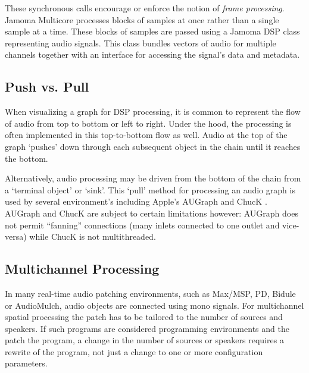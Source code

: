 \documentclass[twoside,a4paper]{article}
\begin{document}

These synchronous calls encourage or enforce the notion of \emph{frame processing}.  
Jamoma Multicore processes blocks of samples at once rather than a single sample at a time.  
These blocks of samples are passed using a Jamoma DSP class representing audio signals.  This class bundles vectors of audio for multiple channels together with an interface for accessing the signal's data and metadata.




\subsection{Push vs. Pull} \label{sec:pull} %

When visualizing a graph for DSP processing, it is common to represent the flow of audio from top to bottom or left to right.  
Under the hood, the processing is often implemented in this top-to-bottom flow as well.  
Audio at the top of the graph `pushes' down through each subsequent object in the chain until it reaches the bottom.

Alternatively, audio processing may be driven from the bottom of the chain from a `terminal object' or `sink'.  
This `pull' method for processing an audio graph is used by several environment's including Apple's AUGraph and ChucK \cite{wang:2008}. 
AUGraph and ChucK are subject to certain limitations however: AUGraph does not permit ``fanning'' connections (many inlets connected to one outlet and vice-versa) while ChucK is not multithreaded.




\subsection{Multichannel Processing} %

In many real-time audio patching environments, such as Max/MSP, PD, Bidule or AudioMulch, audio objects are connected using mono signals. 
For multichannel spatial processing the patch has to be tailored to the number of sources and speakers. 
If such programs are considered programming environments and the patch the program, a change in the number of sources or speakers requires a rewrite of the program, not just a change to one or more configuration parameters.
\end{document}
